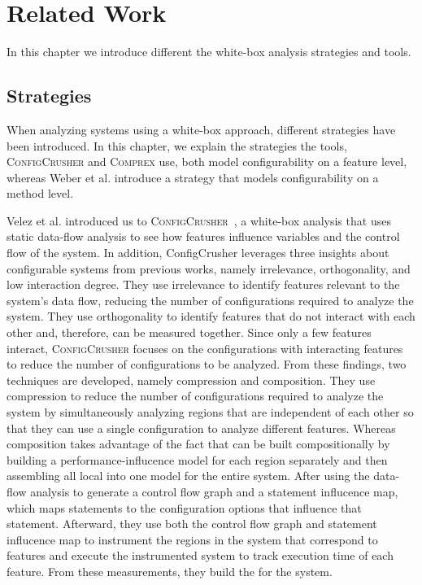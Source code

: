 \chapter{Related Work}\label{ch:relatedwork}

In this chapter we introduce different the white-box analysis strategies and tools. 

\section{Strategies}\label{analyzing-strats}
When analyzing systems using a white-box approach, different strategies have been introduced. 
In this chapter, we explain the strategies the tools, \textsc{ConfigCrusher} and \textsc{Comprex} use, 
both model configurability on a feature level, whereas Weber et al. introduce a strategy that models configurability on a method level.

Velez et al. introduced us to \textsc{ConfigCrusher}~\cite{ConfigCrusher}, 
a white-box analysis that uses static data-flow analysis to see how features influence variables and the control flow of the system. 
In addition, ConfigCrusher leverages three insights about configurable systems from previous works, namely irrelevance, orthogonality, 
and low interaction degree. They use irrelevance to identify features relevant to the system's data flow, 
reducing the number of configurations required to analyze the system. They use orthogonality to identify features that do not interact with each other and, 
therefore, can be measured together. Since only a few features interact, 
\textsc{ConfigCrusher} focuses on the configurations with interacting features to reduce the number of configurations to be analyzed. 
From these findings, two techniques are developed, namely compression and composition. 
They use compression to reduce the number of configurations required to analyze the system by simultaneously analyzing regions that are independent of each other 
so that they can use a single configuration to analyze different features. 
Whereas composition takes advantage of the fact that {\perfInfluenceModel} can be built compositionally by building a performance-influcence model 
for each region separately and then assembling all local {\perfInfluenceModel} into one model for the entire system.
After using the data-flow analysis to generate a control flow graph and a statement influcence map, which maps statements to the configuration options 
that influence that statement.
Afterward, they use both the control flow graph and statement influcence map to instrument the regions in the system that correspond to features and execute
the instrumented system to track execution time of each feature. From these measurements, they build the {\perfInfluenceModel} for the system.

